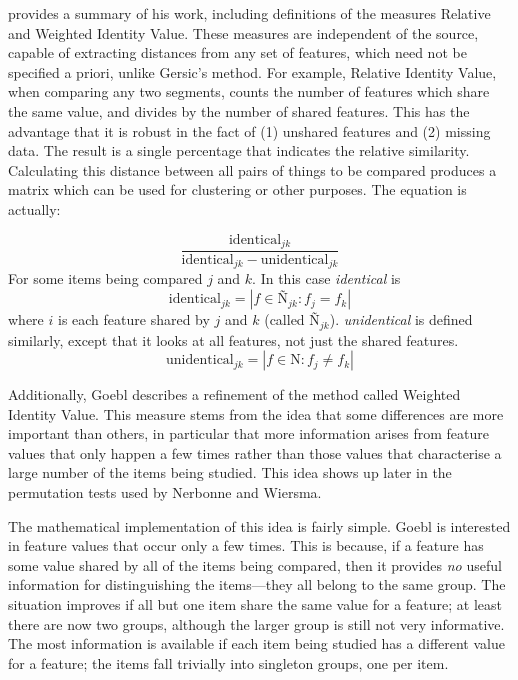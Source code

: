 \documentclass[11pt]{article}
\begin{document}
 provides a summary of his work, including
definitions of the measures Relative and Weighted Identity
Value. These measures are independent of the source, capable of
extracting distances from any set of features, which need not be
specified a priori, unlike Gersic's method. For example, Relative
Identity Value, when comparing any two segments, counts the number of
features which share the same value, and divides by the number of
shared features. This has the advantage that it is robust in the fact
of (1) unshared features and (2) missing data. The result is a single
percentage that indicates the relative similarity. Calculating this
distance between all pairs of things to be compared produces a matrix
which can be used for clustering or other purposes. The equation is
actually:

\begin{equation}
  \frac{\textrm{identical}_{jk}} {\textrm{identical}_{jk} - \textrm{unidentical}_{jk}}
\label{riv}
\end{equation}
For some items being compared $j$ and $k$. In this case
\textit{identical} is
\begin{equation}
  \textrm{identical}_{jk} = |f \in \textrm{\~N}_{jk} : f_j = f_k|
\end{equation}
where $i$ is each feature shared by $j$ and $k$ (called
$\textrm{\~N}_{jk}$). \textit{unidentical} is defined similarly, except
that it looks at all features, not just the shared features.
\begin{equation}
  \textrm{unidentical}_{jk} = |f \in \textrm{N} : f_j \neq f_k|
\end{equation}

Additionally, Goebl
describes a refinement of the method called Weighted Identity
Value. This measure stems from the idea that some differences are
more important than others, in particular that more information arises
from feature values that only happen a few times rather than those
values that characterise a large number of the items being studied.
This idea shows up later in the permutation tests used by Nerbonne and Wiersma.

The mathematical implementation of this idea is fairly simple. Goebl
is interested in feature values that occur only a few times. This is
because, if a feature has some value shared by all of the items being
compared, then it provides {\it no} useful information for
distinguishing the items---they all belong to the same group.
The situation improves if all but one item
share the same value for a feature; at least there are now two
groups, although the larger group is still not very informative.
The most information is available if each item being studied
has a different value for a feature; the items fall trivially into
singleton groups, one per item.
\end{document}
